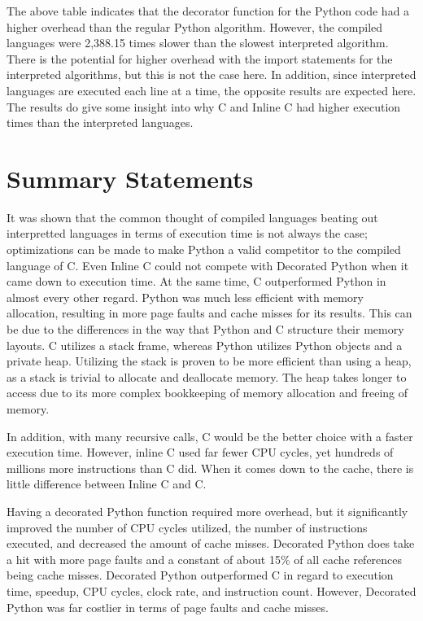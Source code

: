 \documentclass{sig-alternate}
\begin{document}
The above table indicates that the decorator function for the Python code had a higher overhead than the regular Python algorithm. However, the compiled languages were 2,388.15 times slower than the slowest interpreted algorithm. There is the potential for higher overhead with the import statements for the interpreted algorithms, but this is not the case here. In addition, since interpreted languages are executed each line at a time, the opposite results are expected here. The results do give some insight into why C and Inline C had higher execution times than the interpreted languages.

\section{Summary Statements}

It was shown that the common thought of compiled languages beating out interpretted languages in terms of execution time is not always the case; optimizations can be made to make Python a valid competitor to the compiled language of C. Even Inline C could not compete with Decorated Python when it came down to execution time. At the same time, C outperformed Python in almost every other regard. Python was much less efficient with memory allocation, resulting in more page faults and cache misses for its results. This can be due to the differences in the way that Python and C structure their memory layouts. C utilizes a stack frame, whereas Python utilizes Python objects and a private heap. Utilizing the stack is proven to be more efficient than using a heap, as a stack is trivial to allocate and deallocate memory. The heap takes longer to access due to its more complex bookkeeping of memory allocation and freeing of memory.

In addition, with many recursive calls, C would be the better choice with a faster execution time. However, inline C used far fewer CPU cycles, yet hundreds of millions more instructions than C did. When it comes down to the cache, there is little difference between Inline C and C.

Having a decorated Python function required more overhead, but it significantly improved the number of CPU cycles utilized, the number of instructions executed, and decreased the amount of cache misses. Decorated Python does take a hit with more page faults and a constant of about 15\% of all cache references being cache misses. Decorated Python outperformed C in regard to execution time, speedup, CPU cycles, clock rate, and instruction count. However, Decorated Python was far costlier in terms of page faults and cache misses.
\end{document}

